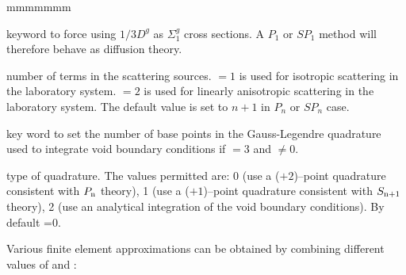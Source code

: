 \begin{ListeDeDescription}{mmmmmmm}
\item[\moc{DIFF}] keyword to force using $1/3D^{g}$ as $\Sigma_1^{g}$ cross sections. A $P_1$ or $SP_1$ method
will therefore behave as diffusion theory.

\item[\dusa{iscat}] number of terms in the scattering sources.  $=1$ is used for
isotropic scattering in the laboratory system.  $=2$ is used for
linearly anisotropic scattering in the laboratory system. The default value is set to $n+1$
in $P_n$ or $SP_n$ case.

\item[\moc{VOID}] key word to set the number of base points in the Gauss-Legendre quadrature used to integrate
void boundary conditions if  $=3$ and  $\ne 0$.

\item[\dusa{nvd}] type of quadrature. The values
permitted are: 0 (use a ($+2$)--point quadrature consistent with $P_{{\rm n}}$ theory),
1 (use a ($+1$)--point quadrature consistent with $S_{{\rm n}+1}$ theory),
2 (use an analytical integration of the void boundary conditions). By default =0.

\end{ListeDeDescription}

Various finite element approximations can be obtained by combining different
values of  and :


